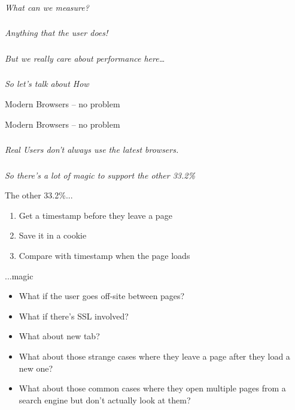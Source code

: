 \documentclass{beamer}
\newcommand{\innersplash}[1]{
  \begin{center}
    \Large \textrm{\textit{ #1 } }
  \end{center}
}
\newcommand{\splashslide}[2][{}]{
  \begin{frame}
  \frametitle{#1}
  \innersplash{#2}
  \end{frame}
}
\begin{document}
\splashslide{What can we measure?}

\splashslide{Anything that the user does! \\ \only<2->{(in the browser)}}

\splashslide{But we really care about performance here\ldots}

\splashslide{So let's talk about How}

\begin{frame}{Modern Browsers -- no problem}
\end{frame}

\begin{frame}{Modern Browsers -- no problem}
\end{frame}

\splashslide{Real Users don't always use the latest browsers.}

\splashslide{So there's a lot of magic to support the other 33.2\%}

\begin{frame}{The other 33.2\%...}
  \begin{enumerate}
  \item Get a timestamp before they leave a page
  \item Save it in a cookie
  \item Compare with timestamp when the page loads
  \end{enumerate}
\end{frame}

\begin{frame}{...magic}
  \begin{itemize}
    \item What if the user goes off-site between pages?
    \item What if there's SSL involved?
    \item What about new tab?
    \item What about those strange cases where they leave a page after they load a new one?
    \item What about those common cases where they open multiple pages from a search engine but don't actually look at them?
  \end{itemize}
\end{frame}
\end{document}
